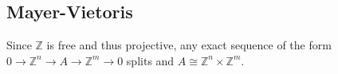 \begin{example}

\end{example}

\begin{example}

\end{example}

\begin{example}[Surfaces]

\end{example}


\hypertarget{mayer-vietoris}{%
\subsection{Mayer-Vietoris}\label{mayer-vietoris}}

\begin{fact}

Since \({\mathbb{Z}}\) is free and thus projective, any exact sequence
of the form \(0 \to {\mathbb{Z}}^n \to A \to {\mathbb{Z}}^m \to 0\)
splits and \(A\cong {\mathbb{Z}}^{n}\times{\mathbb{Z}}^m\).

\end{fact}

